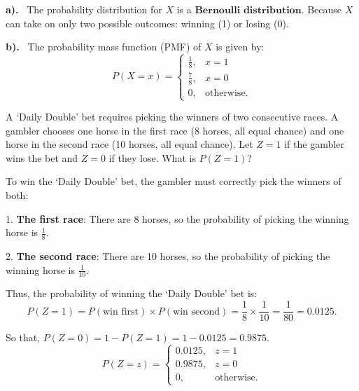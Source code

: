 \documentclass[a4paper, 10pt]{article}
\begin{document}
\begin{solution}
\par\noindent\textbf{a).} \, The probability distribution for \( X \) is a \( \boxed{\textbf{Bernoulli distribution}} \).
Because \( X \) can take on only two possible outcomes: winning (1) or losing (0).

\vspace{2mm}

\par\noindent\textbf{b).} \, The probability mass function (PMF) of \( X \) is given by:
\[\boxed{
    P(X = x) =
    \begin{cases}
    \frac{1}{8}, & x=1\\
    \frac{7}{8}, & x=0\\
    0, & \text{otherwise.}
    \end{cases}
}\]
\end{solution}


\begin{problem}
A `Daily Double' bet requires picking the winners of two consecutive races.
A gambler chooses one horse in the first race (8 horses, all equal chance) and
one horse in the second race (10 horses, all equal chance).
Let \( Z = 1 \) if the gambler wins the bet and \( Z = 0 \) if they lose. What is \( P(Z = 1) \)?
\end{problem}

\begin{solution}
To win the `Daily Double' bet, the gambler must correctly pick the winners of both:
\par 1. \textbf{The first race}: There are 8 horses, so the probability of picking the winning horse is \( \frac{1}{8} \).
\par 2. \textbf{The second race}: There are 10 horses, so the probability of picking the winning horse is \( \frac{1}{10} \).

\vspace{2mm}

Thus, the probability of winning the `Daily Double' bet is:
\[
    P(Z = 1) = P(\text{win first}) \times P(\text{win second}) = \frac{1}{8} \times \frac{1}{10} = \frac{1}{80} = 0.0125.
\]

So that, \( P(Z = 0) = 1 - P(Z = 1) = 1 - 0.0125 = 0.9875 \).
\[\boxed{
    P(Z = z) =
    \begin{cases}
    0.0125, & z=1\\
    0.9875, & z=0\\
    0, & \text{otherwise.}
    \end{cases}
}\]

\end{solution}
\end{document}

